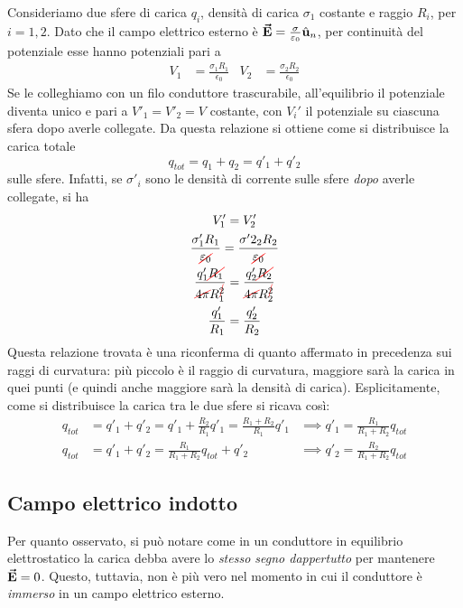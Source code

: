 \begin{itemize}
	\begin{example}
		Consideriamo due sfere di carica $q_i$, densità di carica $\sigma_1$ costante e raggio $R_i$, per $i = 1, 2$. Dato che il campo elettrico esterno è $\vb*{\va{E}}=\frac{\sigma}{\varepsilon_0}\hat{\mathbf{u}}_n$, per continuità del potenziale esse hanno potenziali pari a
		\begin{align*}
			V_1&=\frac{\sigma_1 R_1}{\epsilon_0} & V_2&=\frac{\sigma_2 R_2}{\epsilon_0}
		\end{align*}
		Se le colleghiamo con un filo conduttore trascurabile, all'equilibrio il potenziale diventa unico e pari a $V'_1=V'_2=V$ costante, con $V_i'$ il potenziale su ciascuna sfera dopo averle collegate. Da questa relazione si ottiene come si distribuisce la carica totale
		\begin{equation*}
			q_{tot}=q_1+q_2=q'_1+q'_2
		\end{equation*}
		sulle sfere. Infatti, se $\sigma'_i$ sono le densità di corrente sulle sfere \textit{dopo} averle collegate, si ha
		\begin{gather*}
			V'_1=V'_2\\
			\frac{\sigma'_1R_1}{\Ccancel[red]{\epsilon_0}}=\frac{\sigma'2_2R_2}{\Ccancel[red]{\epsilon_0}}\\
			\frac{q'_1\Ccancel[red]{R_1}}{\Ccancel[red]{4\pi} R_1^{\Ccancel[red]{2}}}=\frac{q'_2\Ccancel[red]{R_2}}{\Ccancel[red]{4\pi} R_2^{\Ccancel[red]{2}}}\\
			\frac{q'_1}{R_1}=\frac{q'_2}{R_2}
		\end{gather*}
		Questa relazione trovata è una riconferma di quanto affermato in precedenza sui raggi di curvatura: più piccolo è il raggio di curvatura, maggiore sarà la carica in quei punti (e quindi anche maggiore sarà la densità di carica). Esplicitamente, come si distribuisce la carica tra le due sfere si ricava così:
		\begin{align*}
			q_{tot}&=q'_1+q'_2=q'_1+\frac{R_2}{R_1}q'_1=\frac{R_1+R_2}{R_1}q'_1&\implies q'_1=\frac{R_1}{R_1+R_2}q_{tot}\\
			q_{tot}&=q'_1+q'_2=\frac{R_1}{R_1+R_2}q_{tot}+q'_2 &\implies q'_2=\frac{R_2}{R_1+R_2}q_{tot}
		\end{align*}
	\end{example}
\end{itemize}
\subsection{Campo elettrico indotto}
Per quanto osservato, si può notare come in un conduttore in equilibrio elettrostatico la carica debba avere lo \textit{stesso segno dappertutto} per mantenere $\vb*{\va{E}}=0$. Questo, tuttavia, non è più vero nel momento in cui il conduttore è \textit{immerso} in un campo elettrico esterno.

